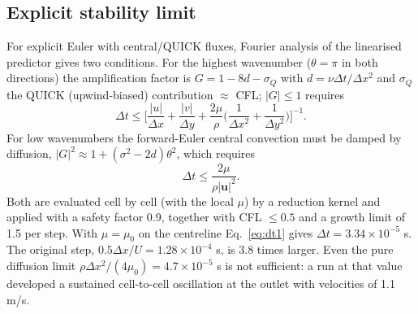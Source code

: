 \subsection{Explicit stability limit}
For explicit Euler with central/QUICK fluxes, Fourier analysis of the linearised predictor gives two conditions. For the highest wavenumber ($\theta=\pi$ in both directions) the amplification factor is $G=1-8d-\sigma_Q$ with $d=\nu\Delta t/\Delta x^2$ and $\sigma_Q$ the QUICK (upwind-biased) contribution $\approx$ CFL; $|G|\le1$ requires
\begin{equation}
\Delta t\le\Big[\frac{|u|}{\Delta x}+\frac{|v|}{\Delta y}+\frac{2\mu}{\rho}\Big(\frac1{\Delta x^2}+\frac1{\Delta y^2}\Big)\Big]^{-1}. \label{eq:dt1}
\end{equation}
For low wavenumbers the forward-Euler central convection must be damped by diffusion, $|G|^2\approx1+(\sigma^2-2d)\theta^2$, which requires
\begin{equation}
\Delta t\le\frac{2\mu}{\rho|\mathbf{u}|^2}. \label{eq:dt2}
\end{equation}
Both are evaluated cell by cell (with the local $\mu$) by a reduction kernel and applied with a safety factor 0.9, together with CFL $\le0.5$ and a growth limit of 1.5 per step. With $\mu=\mu_0$ on the centreline Eq.~\eqref{eq:dt1} gives $\Delta t=3.34\times10^{-5}$ s. The original step, $0.5\Delta x/U=1.28\times10^{-4}$ s, is 3.8 times larger. Even the pure diffusion limit $\rho\Delta x^2/(4\mu_0)=4.7\times10^{-5}$ s is not sufficient: a run at that value developed a sustained cell-to-cell oscillation at the outlet with velocities of 1.1 m/s.

